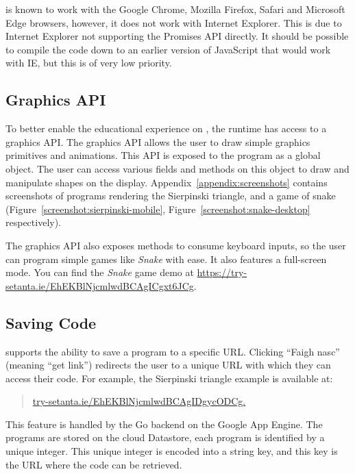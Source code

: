 \trys{} is known to work with the Google Chrome, Mozilla Firefox, Safari and Microsoft Edge browsers, however, it does not work with Internet Explorer. This is due to Internet Explorer not supporting the Promises API directly. It should be possible to compile the code down to an earlier version of JavaScript that would work with IE, but this is of very low priority.

\subsection{Graphics API}

To better enable the educational experience on \trys{}, the \Setanta{} runtime has access to a graphics API. The graphics API allows the user to draw simple graphics primitives and animations. This API is exposed to the \Setanta{} program as a global object. The user can access various fields and methods on this object to draw and manipulate shapes on the display. Appendix~\ref{appendix:screenshots} contains screenshots of programs rendering the Sierpinski triangle, and a game of snake (Figure~\ref{screenshot:sierpinski-mobile}, Figure~\ref{screenshot:snake-desktop} respectively).

The graphics API also exposes methods to consume keyboard inputs, so the user can program simple games like \emph{Snake} with ease. It also features a full-screen mode. You can find the \emph{Snake} game demo at \url{https://try-setanta.ie/EhEKBlNjcmlwdBCAgICgxt6JCg}.

\subsection{Saving Code}

\trys{} supports the ability to save a program to a specific URL. Clicking ``Faigh nasc'' (meaning ``get link'') redirects the user to a unique URL with which they can access their code. For example, the Sierpinski triangle example is available at:
\begin{quote}
    \href{https://try-setanta.ie/EhEKBlNjcmlwdBCAgIDgycODCg}{try-setanta.ie/EhEKBlNjcmlwdBCAgIDgycODCg.}
\end{quote}

This feature is handled by the Go backend on the Google App Engine. The programs are stored on the cloud Datastore, each program is identified by a unique integer. This unique integer is encoded into a string key, and this key is the URL where the code can be retrieved.

